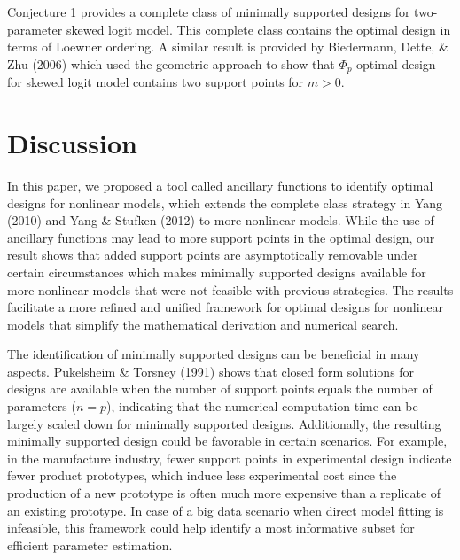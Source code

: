 \documentclass[12pt]{TD-CJS}
\begin{document}
Conjecture 1 provides a complete class of minimally supported designs for two-parameter skewed logit model. This complete class contains the optimal design in terms of Loewner ordering. A similar result is provided by Biedermann, Dette, \& Zhu (2006) which used the geometric approach to show that $\Phi_p$ optimal design for skewed logit model contains two support points for $m>0$. 



\section{Discussion}\label{dis}
In this paper, we proposed a tool called ancillary functions to identify optimal designs for nonlinear models, which extends the complete class strategy in Yang (2010) and Yang \& Stufken (2012) to more nonlinear models. While the use of ancillary functions may lead to more support points in the optimal design, our result shows that added support points are asymptotically removable under certain circumstances which makes minimally supported designs available for more nonlinear models that were not feasible with previous strategies. The results facilitate a more refined and unified framework for optimal designs for nonlinear models that simplify the mathematical derivation and numerical search.



The identification of minimally supported designs can be beneficial in many aspects. Pukelsheim \& Torsney (1991) shows that closed form solutions for designs are available when the number of support points equals the number of parameters ($n=p$), indicating that the numerical computation time can be largely scaled down for minimally supported designs.  Additionally, the resulting minimally supported design could be favorable in certain scenarios. For example, in the manufacture industry, fewer support points in experimental design indicate fewer product prototypes, which induce less experimental cost since the production of a new prototype is often much more expensive than a replicate of an existing prototype. In case of a big data scenario when direct model fitting is infeasible, this framework could help identify a most informative subset for efficient parameter estimation.

 
 
\end{document}
